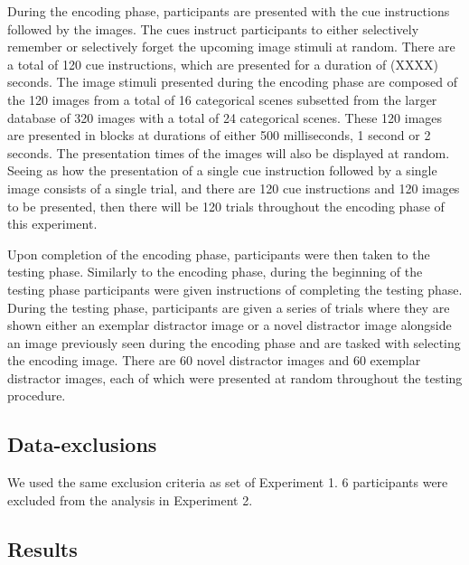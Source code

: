 \documentclass[
  man,floatsintext]{apa6}
\begin{document}
During the encoding phase, participants are presented with the cue instructions followed by the images. The cues instruct participants to either selectively remember or selectively forget the upcoming image stimuli at random. There are a total of 120 cue instructions, which are presented for a duration of (XXXX) seconds. The image stimuli presented during the encoding phase are composed of the 120 images from a total of 16 categorical scenes subsetted from the larger database of 320 images with a total of 24 categorical scenes. These 120 images are presented in blocks at durations of either 500 milliseconds, 1 second or 2 seconds. The presentation times of the images will also be displayed at random. Seeing as how the presentation of a single cue instruction followed by a single image consists of a single trial, and there are 120 cue instructions and 120 images to be presented, then there will be 120 trials throughout the encoding phase of this experiment.

Upon completion of the encoding phase, participants were then taken to the testing phase. Similarly to the encoding phase, during the beginning of the testing phase participants were given instructions of completing the testing phase. During the testing phase, participants are given a series of trials where they are shown either an exemplar distractor image or a novel distractor image alongside an image previously seen during the encoding phase and are tasked with selecting the encoding image. There are 60 novel distractor images and 60 exemplar distractor images, each of which were presented at random throughout the testing procedure.

\hypertarget{data-exclusions}{%
\subsection{Data-exclusions}\label{data-exclusions}}

We used the same exclusion criteria as set of Experiment 1. 6 participants were excluded from the analysis in Experiment 2.

\hypertarget{results-1}{%
\subsection{Results}\label{results-1}}
\end{document}
